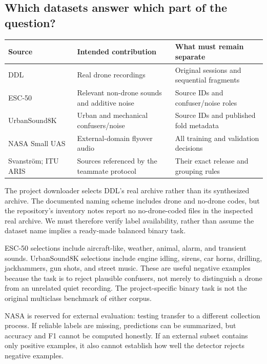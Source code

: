 \documentclass[11pt,letterpaper]{article}
\begin{document}
\subsection{Which datasets answer which part of the question?}
\begin{center}
\small
\begin{tabularx}{\linewidth}{@{}>{\raggedright\arraybackslash}p{3.2cm}YY@{}}
\toprule
Source & Intended contribution & What must remain separate \\
\midrule
DDL~\cite{ddl} & Real drone recordings & Original sessions and sequential fragments \\
ESC-50~\cite{esc50} & Relevant non-drone sounds and additive noise & Source IDs and confuser/noise roles \\
UrbanSound8K~\cite{urbansound} & Urban and mechanical confusers/noise & Source IDs and published fold metadata \\
NASA Small UAS~\cite{nasa} & External-domain flyover audio & All training and validation decisions \\
Svanstr\"om; ITU ARIS~\cite{svanstrom,ituaris} & Sources referenced by the teammate protocol & Their exact release and grouping rules \\
\bottomrule
\end{tabularx}
\end{center}
The project downloader selects DDL's real archive rather than its synthesized
archive. The documented naming scheme includes drone and no-drone codes, but
the repository's inventory notes report no no-drone-coded files in the
inspected real archive. We must therefore verify label availability, rather
than assume the dataset name implies a ready-made balanced binary task.

ESC-50 selections include aircraft-like, weather, animal, alarm, and transient
sounds. UrbanSound8K selections include engine idling, sirens, car horns,
drilling, jackhammers, gun shots, and street music. These are useful negative
examples because the task is to reject plausible confusers, not merely to
distinguish a drone from an unrelated quiet recording. The project-specific
binary task is not the original multiclass benchmark of either corpus.

NASA is reserved for external evaluation: testing transfer to a different
collection process. If reliable labels are missing, predictions can be
summarized, but accuracy and F1 cannot be computed honestly. If an external
subset contains only positive examples, it also cannot establish how well the
detector rejects negative examples.
\end{document}
